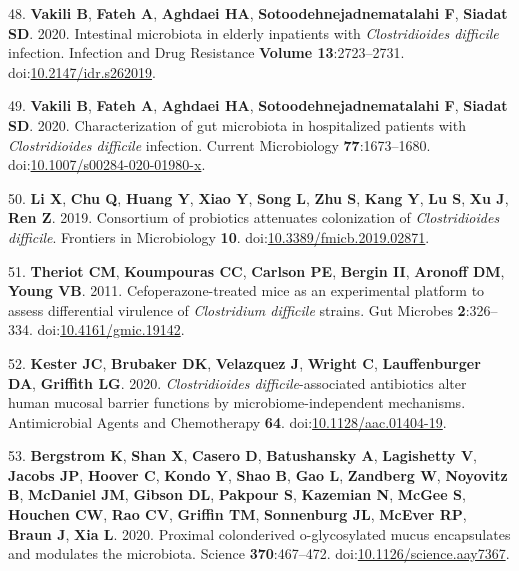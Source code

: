 \documentclass[
  11pt,
]{article}
\begin{document}
\leavevmode\hypertarget{ref-Vakili2020a}{}%
48. \textbf{Vakili B}, \textbf{Fateh A}, \textbf{Aghdaei HA},
\textbf{Sotoodehnejadnematalahi F}, \textbf{Siadat SD}. 2020. Intestinal
microbiota in elderly inpatients with \emph{Clostridioides difficile}
infection. Infection and Drug Resistance \textbf{Volume 13}:2723--2731.
doi:\href{https://doi.org/10.2147/idr.s262019}{10.2147/idr.s262019}.

\leavevmode\hypertarget{ref-Vakili2020b}{}%
49. \textbf{Vakili B}, \textbf{Fateh A}, \textbf{Aghdaei HA},
\textbf{Sotoodehnejadnematalahi F}, \textbf{Siadat SD}. 2020.
Characterization of gut microbiota in hospitalized patients with
\emph{Clostridioides difficile} infection. Current Microbiology
\textbf{77}:1673--1680.
doi:\href{https://doi.org/10.1007/s00284-020-01980-x}{10.1007/s00284-020-01980-x}.

\leavevmode\hypertarget{ref-Li2019}{}%
50. \textbf{Li X}, \textbf{Chu Q}, \textbf{Huang Y}, \textbf{Xiao Y},
\textbf{Song L}, \textbf{Zhu S}, \textbf{Kang Y}, \textbf{Lu S},
\textbf{Xu J}, \textbf{Ren Z}. 2019. Consortium of probiotics attenuates
colonization of \emph{Clostridioides difficile}. Frontiers in
Microbiology \textbf{10}.
doi:\href{https://doi.org/10.3389/fmicb.2019.02871}{10.3389/fmicb.2019.02871}.

\leavevmode\hypertarget{ref-Theriot2011}{}%
51. \textbf{Theriot CM}, \textbf{Koumpouras CC}, \textbf{Carlson PE},
\textbf{Bergin II}, \textbf{Aronoff DM}, \textbf{Young VB}. 2011.
Cefoperazone-treated mice as an experimental platform to assess
differential virulence of \emph{Clostridium difficile} strains. Gut
Microbes \textbf{2}:326--334.
doi:\href{https://doi.org/10.4161/gmic.19142}{10.4161/gmic.19142}.

\leavevmode\hypertarget{ref-Kester2020}{}%
52. \textbf{Kester JC}, \textbf{Brubaker DK}, \textbf{Velazquez J},
\textbf{Wright C}, \textbf{Lauffenburger DA}, \textbf{Griffith LG}.
2020. \emph{Clostridioides difficile}-associated antibiotics alter human
mucosal barrier functions by microbiome-independent mechanisms.
Antimicrobial Agents and Chemotherapy \textbf{64}.
doi:\href{https://doi.org/10.1128/aac.01404-19}{10.1128/aac.01404-19}.

\leavevmode\hypertarget{ref-Bergstrom2020}{}%
53. \textbf{Bergstrom K}, \textbf{Shan X}, \textbf{Casero D},
\textbf{Batushansky A}, \textbf{Lagishetty V}, \textbf{Jacobs JP},
\textbf{Hoover C}, \textbf{Kondo Y}, \textbf{Shao B}, \textbf{Gao L},
\textbf{Zandberg W}, \textbf{Noyovitz B}, \textbf{McDaniel JM},
\textbf{Gibson DL}, \textbf{Pakpour S}, \textbf{Kazemian N},
\textbf{McGee S}, \textbf{Houchen CW}, \textbf{Rao CV}, \textbf{Griffin
TM}, \textbf{Sonnenburg JL}, \textbf{McEver RP}, \textbf{Braun J},
\textbf{Xia L}. 2020. Proximal colonderived o-glycosylated mucus
encapsulates and modulates the microbiota. Science
\textbf{370}:467--472.
doi:\href{https://doi.org/10.1126/science.aay7367}{10.1126/science.aay7367}.
\end{document}
